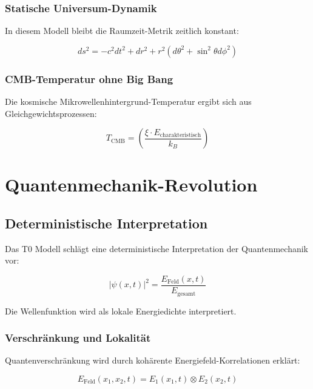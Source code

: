 \documentclass[12pt,a4paper]{report}
\begin{document}
	\subsection{Statische Universum-Dynamik}
	
	In diesem Modell bleibt die Raumzeit-Metrik zeitlich konstant:
	
	\begin{equation}
		ds^2 = -c^2 dt^2 + dr^2 + r^2(d\theta^2 + \sin^2\theta d\phi^2)
	\end{equation}
	
	\subsection{CMB-Temperatur ohne Big Bang}
	
	Die kosmische Mikrowellenhintergrund-Temperatur ergibt sich aus Gleichgewichtsprozessen:
	
	\begin{equation}
		T_{\text{CMB}} = \left(\frac{\xi \cdot E_{\text{charakteristisch}}}{k_B}\right)
	\end{equation}
	
	\chapter{Quantenmechanik-Revolution}
	
	\section{Deterministische Interpretation}
	
	Das T0 Modell schlägt eine deterministische Interpretation der Quantenmechanik vor:
	
	\begin{equation}
		|\psi(x,t)|^2 = \frac{E_{\text{Feld}}(x,t)}{E_{\text{gesamt}}}
	\end{equation}
	
	Die Wellenfunktion wird als lokale Energiedichte interpretiert.
	
	\subsection{Verschränkung und Lokalität}
	
	Quantenverschränkung wird durch kohärente Energiefeld-Korrelationen erklärt:
	
	\begin{equation}
		E_{\text{Feld}}(x_1, x_2, t) = E_1(x_1,t) \otimes E_2(x_2,t)
	\end{equation}
	
\end{document}
